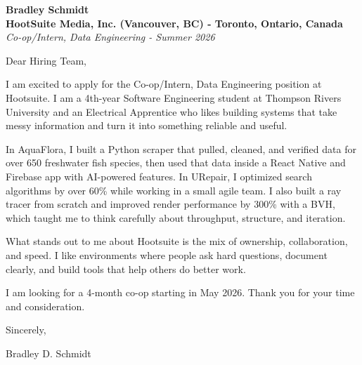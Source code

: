 \documentclass[11pt]{article}
\begin{document}
\textbf{Bradley Schmidt}\\
\vspace{0.5em}
\textbf{HootSuite Media, Inc. (Vancouver, BC) - Toronto, Ontario, Canada}\\
\textit{Co-op/Intern, Data Engineering - Summer 2026}

Dear Hiring Team,

\par

I am excited to apply for the Co-op/Intern, Data Engineering position at Hootsuite. I am a 4th-year Software Engineering student at Thompson Rivers University and an Electrical Apprentice who likes building systems that take messy information and turn it into something reliable and useful.

\par

In AquaFlora, I built a Python scraper that pulled, cleaned, and verified data for over 650 freshwater fish species, then used that data inside a React Native and Firebase app with AI-powered features. In URepair, I optimized search algorithms by over 60\% while working in a small agile team. I also built a ray tracer from scratch and improved render performance by 300\% with a BVH, which taught me to think carefully about throughput, structure, and iteration.

\par

What stands out to me about Hootsuite is the mix of ownership, collaboration, and speed. I like environments where people ask hard questions, document clearly, and build tools that help others do better work.

\par

I am looking for a 4-month co-op starting in May 2026. Thank you for your time and consideration.

\par

Sincerely,

\par

Bradley D. Schmidt
\end{document}
